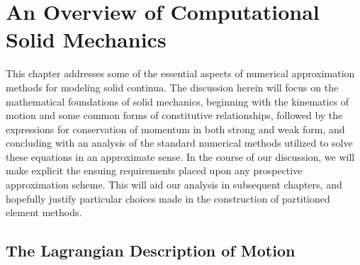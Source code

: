 \chapter{An Overview of Computational Solid Mechanics} \label{ch:solid_mechanics}
%
This chapter addresses some of the essential aspects of numerical approximation methods for modeling solid continua. The discussion herein will focus on the mathematical foundations of solid mechanics, beginning with the kinematics of motion and some common forms of constitutive relationships, followed by the expressions for conservation of momentum in both strong and weak form, and concluding with an analysis of the standard numerical methods utilized to solve these equations in an approximate sense. In the course of our discussion, we will make explicit the ensuing requirements placed upon any prospective approximation scheme. This will aid our analysis in subsequent chapters, and hopefully justify particular choices made in the construction of partitioned element methods.

\newpage

\section{The Lagrangian Description of Motion}

